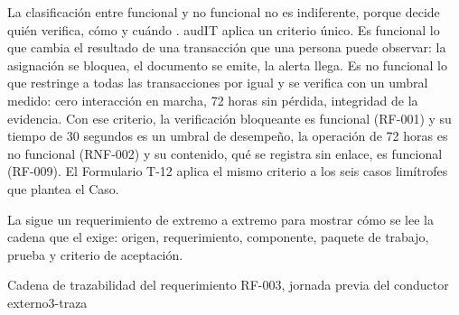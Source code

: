 La clasificación entre funcional y no funcional no es indiferente, porque decide quién verifica, cómo
y cuándo . audIT aplica un criterio único. Es funcional lo que cambia el
resultado de una transacción que una persona puede observar: la asignación se bloquea, el documento se
emite, la alerta llega. Es no funcional lo que restringe a todas las transacciones por igual y se
verifica con un umbral medido: cero interacción en marcha, 72 horas sin pérdida, integridad de la
evidencia. Con ese criterio, la verificación bloqueante es funcional (RF-001) y su tiempo de 30
segundos es un umbral de desempeño, la operación de 72 horas es no funcional (RNF-002) y su contenido,
qué se registra sin enlace, es funcional (RF-009). El Formulario T-12 aplica el mismo criterio a los
seis casos limítrofes que plantea el Caso.

La  sigue un requerimiento de extremo a extremo para mostrar cómo se lee la cadena que
el  exige: origen, requerimiento, componente, paquete de trabajo, prueba y
criterio de aceptación.

\begin{figuraNativa}[!htbp]{Cadena de trazabilidad del requerimiento RF-003, jornada previa del conductor externo}{3-traza}

\par{}
\end{figuraNativa}

